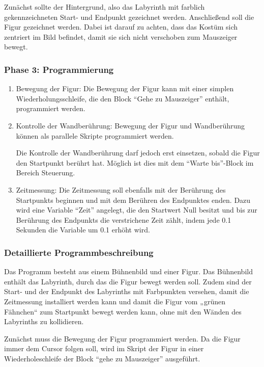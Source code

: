 Zunächst sollte der Hintergrund, also das Labyrinth mit farblich
gekennzeichneten Start- und Endpunkt gezeichnet werden. Anschließend
soll die Figur gezeichnet werden. Dabei ist darauf zu achten, dass das
Kostüm sich zentriert im Bild befindet, damit sie sich nicht verschoben
zum Mauszeiger bewegt.

\subsubsection{Phase 3: Programmierung}\label{phase-3-programmierung}

\begin{enumerate}
\item
  Bewegung der Figur: Die Bewegung der Figur kann mit einer simplen
  Wiederholungsschleife, die den Block ``Gehe zu Mauszeiger'' enthält,
  programmiert werden.
\item
  Kontrolle der Wandberührung: Bewegung der Figur und Wandberührung
  können als parallele Skripte programmiert werden.

  Die Kontrolle der Wandberührung darf jedoch erst einsetzen, sobald die
  Figur den Startpunkt berührt hat. Möglich ist dies mit dem ``Warte
  bis''-Block im Bereich Steuerung.
\item
  Zeitmessung: Die Zeitmessung soll ebenfalls mit der Berührung des
  Startpunkts beginnen und mit dem Berühren des Endpunktes enden. Dazu
  wird eine Variable ``Zeit'' angelegt, die den Startwert Null besitzt
  und bis zur Berührung des Endpunkts die verstrichene Zeit zählt, indem
  jede 0.1 Sekunden die Variable um 0.1 erhöht wird.
\end{enumerate}

\subsubsection{Detaillierte
Programmbeschreibung}\label{detaillierte-programmbeschreibung}

Das Programm besteht aus einem Bühnenbild und einer Figur. Das
Bühnenbild enthält das Labyrinth, durch das die Figur bewegt werden
soll. Zudem sind der Start- und der Endpunkt des Labyrinths mit
Farbpunkten versehen, damit die Zeitmessung installiert werden kann und
damit die Figur vom „grünen Fähnchen`` zum Startpunkt bewegt werden
kann, ohne mit den Wänden des Labyrinths zu kollidieren.

Zunächst muss die Bewegung der Figur programmiert werden. Da die Figur
immer dem Cursor folgen soll, wird im Skript der Figur in einer
Wiederholeschleife der Block ``gehe zu Mauszeiger'' ausgeführt.

